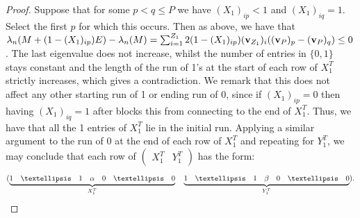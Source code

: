 \documentclass[12pt]{article}
\begin{document}
\begin{proof}
Suppose that for some $p<q\le P$ we have $(X_1)_{ip}<1$ and $(X_1)_{iq}=1$. Select the first $p$ for which this occurs. Then as above, we have that $\lambda_{n}(M+(1-(X_1)_{ip})E)-\lambda_{n}(M) = \sum_{i=1}^{Z_1} 2(1-(X_1)_{ip})(\bold{v}_{Z_1})_i((\bold{v}_P)_p - (\bold{v}_P)_q) \le 0$. The last eigenvalue does not increase, whilst the number of entries in $\{0,1\}$ stays constant and the length of the run of 1's at the start of each row of $X_1^T$ strictly increases, which gives a contradiction. We remark that this does not affect any other starting run of 1 or ending run of 0, since if $(X_1)_{ip} = 0$ then having $(X_1)_{iq} = 1$ after blocks this from connecting to the end of $X_1^T$. Thus, we have that all the 1 entries of $X_1^T$ lie in the initial run. Applying a similar argument to the run of 0 at the end of each row of $X_1^T$ and repeating for $Y_1^T$, we may conclude that each row of $\begin{pmatrix}X_1^T & Y_1^T\end{pmatrix}$ has the form:
\[(\underbrace{1 \quad \dots \quad 1 \quad \alpha \quad 0 \quad \dots \quad 0}_{X_1^T} \quad \underbrace{1 \quad \dots \quad 1 \quad \beta \quad 0 \quad \dots \quad 0}_{Y_1^T}).\qedhere\]
\end{proof}
\end{document}
